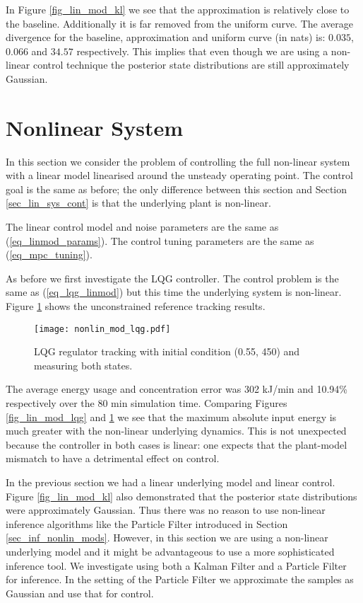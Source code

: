 In Figure \ref{fig_lin_mod_kl} we see that the approximation is relatively close to the baseline. Additionally it is far removed from the uniform curve. The average divergence for the baseline, approximation and uniform curve (in nats) is: $0.035$, $0.066$ and $34.57$ respectively. This implies that even though we are using a non-linear control technique the posterior state distributions are still approximately Gaussian. 


\section{Nonlinear System}
In this section we consider the problem of controlling the full non-linear system with a linear model linearised around the unsteady operating point. The control goal is the same as before; the only difference between this section and Section \ref{sec_lin_sys_cont} is that the underlying plant is non-linear.

The linear control model and noise parameters are the same as (\ref{eq_linmod_params}). The control tuning parameters are the same as (\ref{eq_mpc_tuning}).

As before we first investigate the LQG controller. The control problem is the same as (\ref{eq_lqg_linmod}) but this time the underlying system is non-linear. Figure \ref{fig_nonlin_lqg} shows the unconstrained reference tracking results.
\begin{figure}[H] 
\centering
\texttt{[image: nonlin\_mod\_lqg.pdf]}
\caption{LQG regulator tracking with initial condition (0.55, 450) and measuring both states.}
\label{fig_nonlin_lqg}
\end{figure}
The average energy usage and concentration error was 302 kJ/min and 10.94\% respectively over the 80 min simulation time. Comparing Figures \ref{fig_lin_mod_lqg} and \ref{fig_nonlin_lqg} we see that the maximum absolute input energy is much greater with the non-linear underlying dynamics. This is not unexpected because the controller in both cases is linear: one expects that the plant-model mismatch to have a detrimental effect on control.

In the previous section we had a linear underlying model and linear control. Figure \ref{fig_lin_mod_kl} also demonstrated that the posterior state distributions were approximately Gaussian. Thus there was no reason to use non-linear inference algorithms like the Particle Filter introduced in Section \ref{sec_inf_nonlin_mods}. However, in this section we are using a non-linear underlying model and it might be advantageous to use a more sophisticated inference tool. We investigate using both a Kalman Filter and a Particle Filter for inference. In the setting of the Particle Filter we approximate the samples as Gaussian and use that for control.


